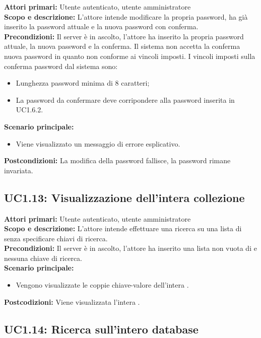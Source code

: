 \documentclass{scalatekids-article}
\begin{document}
\textbf{Attori primari:} Utente autenticato, utente amministratore\\
\textbf{Scopo e descrizione:} L'attore intende modificare la propria password, ha già inserito la password attuale e la nuova password con conferma.\\
\textbf{Precondizioni:} Il server è in ascolto, l'attore ha inserito la propria password attuale, la nuova password e la conferma. Il sistema non accetta la conferma nuova password in quanto non conforme ai
vincoli imposti. I vincoli imposti sulla conferma password dal sistema sono:
\begin{itemize}
\item Lunghezza password minima di 8 caratteri;
\item La password da confermare deve corripondere alla password inserita in UC1.6.2.
\end{itemize}
\textbf{Scenario principale:}
\begin{itemize}
\item Viene visualizzato un messaggio di errore esplicativo.
\end{itemize}
\textbf{Postcondizioni:} La modifica della password fallisce, la password rimane invariata.

\subsection{UC1.13: Visualizzazione dell'intera collezione}

\textbf{Attori primari:} Utente autenticato, utente amministratore\\
\textbf{Scopo e descrizione:} L'attore intende effettuare una ricerca su una lista di  senza specificare chiavi di ricerca.\\
\textbf{Precondizioni:} Il server è in ascolto, l'attore ha inserito una lista non vuota di  e nessuna chiave di ricerca.\\
\textbf{Scenario principale:}
\begin{itemize}
\item Vengono visualizzate le coppie chiave-valore dell'intera .
\end{itemize}
\textbf{Postcodizioni:} Viene visualizzata l'intera .

\subsection{UC1.14: Ricerca sull'intero database}
\end{document}
